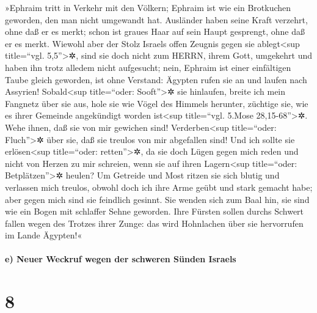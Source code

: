  »Ephraim tritt in Verkehr mit den Völkern; Ephraim ist
wie ein Brotkuchen geworden, den man nicht umgewandt hat. 
Ausländer haben seine Kraft verzehrt, ohne daß er es merkt; schon ist
graues Haar auf sein Haupt gesprengt, ohne daß er es merkt.
 Wiewohl aber der Stolz Israels offen Zeugnis gegen sie
ablegt\textless sup title=``vgl. 5,5''\textgreater✲, sind sie doch nicht
zum HERRN, ihrem Gott, umgekehrt und haben ihn trotz alledem nicht
aufgesucht;  nein, Ephraim ist einer einfältigen Taube
gleich geworden, ist ohne Verstand: Ägypten rufen sie an und laufen nach
Assyrien!  Sobald\textless sup title=``oder:
Sooft''\textgreater✲ sie hinlaufen, breite ich mein Fangnetz über sie
aus, hole sie wie Vögel des Himmels herunter, züchtige sie, wie es ihrer
Gemeinde angekündigt worden ist\textless sup title=``vgl. 5.Mose
28,15-68''\textgreater✲.  Wehe ihnen, daß sie von mir
gewichen sind! Verderben\textless sup title=``oder: Fluch''\textgreater✲
über sie, daß sie treulos von mir abgefallen sind! Und ich sollte sie
erlösen\textless sup title=``oder: retten''\textgreater✲, da sie doch
Lügen gegen mich reden  und nicht von Herzen zu mir
schreien, wenn sie auf ihren Lagern\textless sup title=``oder:
Betplätzen''\textgreater✲ heulen? Um Getreide und Most ritzen sie sich
blutig und verlassen mich treulos,  obwohl doch ich ihre
Arme geübt und stark gemacht habe; aber gegen mich sind sie feindlich
gesinnt.  Sie wenden sich zum Baal hin, sie sind wie ein
Bogen mit schlaffer Sehne geworden. Ihre Fürsten sollen durchs Schwert
fallen wegen des Trotzes ihrer Zunge: das wird Hohnlachen über sie
hervorrufen im Lande Ägypten!«

\hypertarget{e-neuer-weckruf-wegen-der-schweren-suxfcnden-israels}{%
\paragraph{e) Neuer Weckruf wegen der schweren Sünden
Israels}\label{e-neuer-weckruf-wegen-der-schweren-suxfcnden-israels}}

\hypertarget{section-7}{%
\section{8}\label{section-7}}

